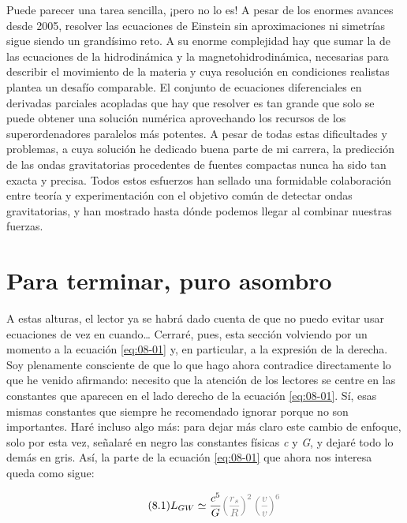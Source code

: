 Puede parecer una tarea sencilla, ¡pero no lo es! A pesar de los enormes avances desde 2005, resolver las ecuaciones de Einstein sin aproximaciones ni simetrías sigue siendo un grandísimo reto. A su enorme complejidad hay que sumar la de las ecuaciones de la hidrodinámica y la magnetohidrodinámica, necesarias para describir el movimiento de la materia y cuya resolución en condiciones realistas plantea un desafío comparable. El conjunto de ecuaciones diferenciales en derivadas parciales acopladas que hay que resolver es tan grande que solo se puede obtener una solución numérica aprovechando los recursos de los superordenadores paralelos más potentes. A pesar de todas estas dificultades y problemas, a cuya solución he dedicado buena parte de mi carrera, la predicción de las ondas gravitatorias procedentes de fuentes compactas nunca ha sido tan exacta y precisa. Todos estos esfuerzos han sellado una formidable colaboración entre teoría y experimentación con el objetivo común de detectar ondas gravitatorias, y han mostrado hasta dónde podemos llegar al combinar nuestras fuerzas.

\section{Para terminar, puro asombro}\label{sec:08-luminosity}

A estas alturas, el lector ya se habrá dado cuenta de que no puedo evitar usar ecuaciones de vez en cuando\ldots{} Cerraré, pues, esta sección volviendo por un momento a la ecuación \eqref{eq:08-01} y, en particular, a la expresión de la derecha. Soy plenamente consciente de que lo que hago ahora contradice directamente lo que he venido afirmando: necesito que la atención de los lectores se centre en las constantes que aparecen en el lado derecho de la ecuación \eqref{eq:08-01}. Sí, esas mismas constantes que siempre he recomendado ignorar porque no son importantes. Haré incluso algo más: para dejar más claro este cambio de enfoque, solo por esta vez, señalaré en negro las constantes físicas \emph{c} y \emph{G}, y dejaré todo lo demás en gris. Así, la parte de la ecuación \eqref{eq:08-01} que ahora nos interesa queda como sigue:

\begingroup\renewcommand{\theHequation}{8.repeat}\begin{equation}\tag{8.1}\label{eq:08-01-repeat}
L_{GW} \simeq \frac{c^{5}}{G}\textcolor{gray}{\left( \frac{r_{s}}{R} \right)^{2}\left( \frac{v}{v} \right)^{6}\ }
\end{equation}\endgroup

